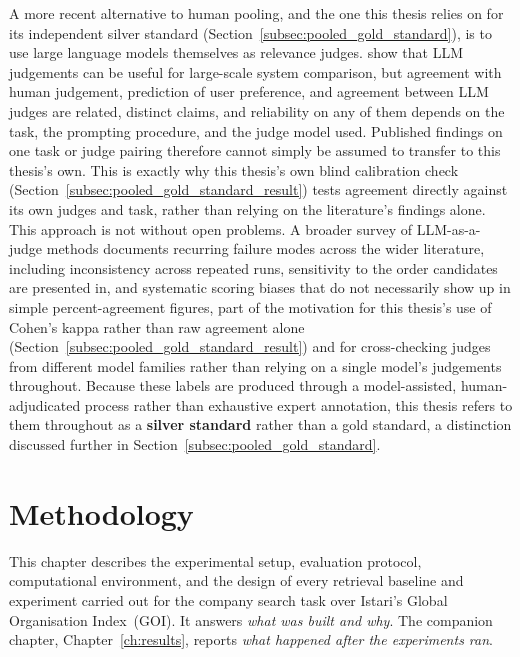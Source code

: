 \documentclass[a4paper,oneside,bibliography=totoc]{scrbook}
\begin{document}
A more recent alternative to human pooling, and the one this thesis relies on for its independent silver standard (Section~\ref{subsec:pooled_gold_standard}), is to use large language models themselves as relevance judges. \citet{thomas2024llmjudge} show that LLM judgements can be useful for large-scale system comparison, but agreement with human judgement, prediction of user preference, and agreement between LLM judges are related, distinct claims, and reliability on any of them depends on the task, the prompting procedure, and the judge model used. Published findings on one task or judge pairing therefore cannot simply be assumed to transfer to this thesis's own. This is exactly why this thesis's own blind calibration check (Section~\ref{subsec:pooled_gold_standard_result}) tests agreement directly against its own judges and task, rather than relying on the literature's findings alone. This approach is not without open problems. A broader survey of LLM-as-a-judge methods \citep{li2024fromgeneration} documents recurring failure modes across the wider literature, including inconsistency across repeated runs, sensitivity to the order candidates are presented in, and systematic scoring biases that do not necessarily show up in simple percent-agreement figures, part of the motivation for this thesis's use of Cohen's kappa rather than raw agreement alone (Section~\ref{subsec:pooled_gold_standard_result}) and for cross-checking judges from different model families rather than relying on a single model's judgements throughout. Because these labels are produced through a model-assisted, human-adjudicated process rather than exhaustive expert annotation, this thesis refers to them throughout as a \textbf{silver standard} rather than a gold standard, a distinction discussed further in Section~\ref{subsec:pooled_gold_standard}.


\chapter{Methodology}
\label{ch:methodology}

This chapter describes the experimental setup, evaluation protocol, computational environment, and the design of every retrieval baseline and experiment carried out for the company search task over Istari's Global Organisation Index~(GOI). It answers \emph{what was built and why}. The companion chapter, Chapter~\ref{ch:results}, reports \emph{what happened after the experiments ran}.
\end{document}
